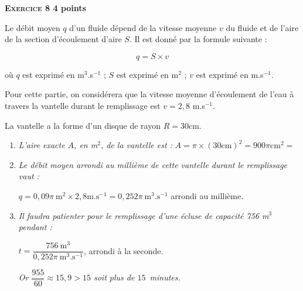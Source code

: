 \textbf{\textsc{Exercice 8} \hfill 4 points}

\medskip 

Le débit moyen $q$ d'un fluide dépend de la vitesse moyenne $v$ du fluide et de l'aire de la section d'écoulement d'aire $S$. Il est donné par la formule suivante : 

\[q = S \times v\]
 
où $q$ est exprimé en m$^3$.s$^{-1}$ ; $S$ est exprimé en m$^2$ ; $v$ est exprimé en m.s$^{-1}$. 

Pour cette partie, on considérera que la vitesse moyenne d'écoulement de l'eau à travers la vantelle durant le remplissage est $v = 2,8$ m.s$^{-1}$.
 
La vantelle a la forme d'un disque de rayon $R = 30$cm. 

\medskip

\begin{enumerate}
\item \textit{L'aire exacte $A$, en m$^2$, de la vantelle est :} $A=\pi\times(30\text{cm})^2=900\pi\text{cm}^2=$
\item \textit{Le débit moyen arrondi au millième de cette vantelle durant le 
remplissage vaut :} 

$q=0,09\pi~\text{m}^2\times 2,8\text{m.s}^{-1}=0,252\pi~\text{m}^3\text{.s}^{-1}$ arrondi au millième.

\item \textit{Il faudra patienter pour le remplissage d'une écluse de capacité 756 m$^3$ pendant :}

$t=\dfrac{756~\text{m}^3}{0,252\pi~\text{m}^3\text{.s}^{-1}}$, arrondi à la seconde.

\textit{Or $\dfrac{955}{60}\approx 15,9> 15$ soit plus de $15$~minutes.}
\end{enumerate}
	 
\vspace{0.5cm}

